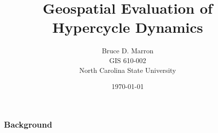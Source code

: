 \documentclass[12pt, letterpaper]{article}
\title{\vspace{-15mm}\fontsize{14pt}{10pt}
                    \selectfont \textbf{Geospatial Evaluation of Hypercycle Dynamics}   %
      }
\author{
     \normalsize Bruce D. Marron \\                     %
     \normalsize GIS 610-002 \\
     \vspace{-5mm}
      \normalsize North Carolina State University      %
     \vspace{7mm}
}
\date{\normalsize \today}
\begin{document}


\maketitle                                      %


\subsubsection* {Background}
                        





\clearpage 
\renewcommand{\thepage}{}


\end{document}

